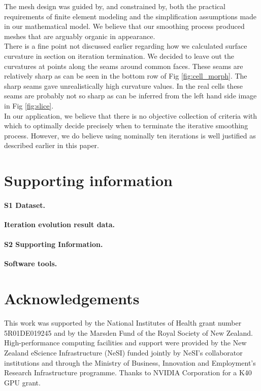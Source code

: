 \documentclass[10pt,letterpaper]{article}
\begin{document}
The mesh design was guided by, and constrained by, both the practical requirements of finite element modeling and the simplification assumptions made in our mathematical model. We believe that our smoothing process produced meshes that are arguably organic in appearance.\\ 

There is a fine point not discussed earlier regarding how we calculated surface curvature in section on iteration termination. We decided to leave out the curvatures at points along the seams around common faces. These seams are relatively sharp as can be seen in the bottom row of Fig \ref{fig:cell_morph}. The sharp seams gave unrealistically high curvature values. In the real cells these seams are probably not so sharp as can be inferred from the left hand side image in Fig \ref{fig:slice}.\\

In our application, we believe that there is no objective collection of criteria with which to optimally decide precisely when to terminate the iterative smoothing process. However, we do believe using nominally ten iterations is well justified as described earlier in this paper.\\

\section*{Supporting information}

\paragraph*{S1 Dataset.}
\label{S1_Table}
{\bf Iteration evolution result data.}

\paragraph*{S2 Supporting Information.}
\label{S2_Supporting_Information}
{\bf Software tools.}




\section*{Acknowledgements}
This work was supported by the National Institutes of Health grant number 5R01DE019245 and by the Marsden Fund of the Royal Society of New Zealand. High-performance computing facilities and support were provided by the New Zealand eScience Infrastructure (NeSI) funded jointly by NeSI's collaborator institutions and through the Ministry of Business, Innovation and Employment's Research Infrastructure programme. Thanks to NVIDIA Corporation for a K40 GPU grant.\\
\end{document}
